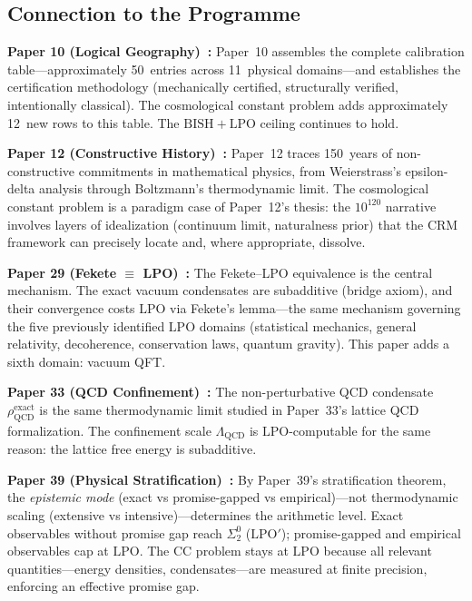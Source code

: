 \documentclass[11pt,a4paper]{article}
\theoremstyle{plain}
\theoremstyle{definition}
\newcommand{\LPO}{\ensuremath{\mathrm{LPO}}}
\newcommand{\BISH}{\ensuremath{\mathrm{BISH}}}
\newcommand{\LQCD}{\Lambda_{\mathrm{QCD}}}
\begin{document}
\subsection{Connection to the Programme}

\textbf{Paper 10 (Logical Geography)~\cite{Lee26P10}:}\quad
Paper~10 assembles the complete calibration table---approximately
50~entries across 11~physical domains---and establishes the
certification methodology (mechanically certified, structurally
verified, intentionally classical).  The cosmological constant
problem adds approximately 12~new rows to this table.  The
$\BISH + \LPO$ ceiling continues to hold.

\textbf{Paper 12 (Constructive History)~\cite{Lee26P12}:}\quad
Paper~12 traces 150~years of non-constructive commitments in
mathematical physics, from Weierstrass's epsilon-delta analysis
through Boltzmann's thermodynamic limit.  The cosmological constant
problem is a paradigm case of Paper~12's thesis: the $10^{120}$
narrative involves layers of idealization (continuum limit,
naturalness prior) that the CRM framework can precisely locate
and, where appropriate, dissolve.

\textbf{Paper 29 (Fekete $\equiv$ LPO)~\cite{Lee26P29}:}\quad
The Fekete--LPO equivalence is the central mechanism.  The exact
vacuum condensates are subadditive (bridge axiom), and their
convergence costs $\LPO$ via Fekete's lemma---the same mechanism
governing the five previously identified $\LPO$ domains (statistical
mechanics, general relativity, decoherence, conservation laws,
quantum gravity).  This paper adds a sixth domain: vacuum QFT.

\textbf{Paper 33 (QCD Confinement)~\cite{Lee26P33}:}\quad
The non-perturbative QCD condensate $\rho_{\mathrm{QCD}}^{\mathrm{exact}}$
is the same thermodynamic limit studied in Paper~33's lattice QCD
formalization.  The confinement scale $\LQCD$ is $\LPO$-computable
for the same reason: the lattice free energy is subadditive.

\textbf{Paper 39 (Physical Stratification)~\cite{Lee26P39}:}\quad
By Paper~39's stratification theorem, the \emph{epistemic mode}
(exact vs promise-gapped vs empirical)---not thermodynamic scaling
(extensive vs intensive)---determines the arithmetic level.
Exact observables without promise gap reach $\Sigma_2^0$ ($\LPO'$);
promise-gapped and empirical observables cap at $\LPO$.
The CC problem stays at $\LPO$ because all relevant
quantities---energy densities, condensates---are measured at finite
precision, enforcing an effective promise gap.
\end{document}
